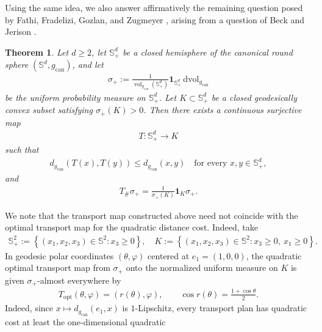 \documentclass[11pt,reqno]{amsart}
\numberwithin{equation}{section}
\newtheorem{thm}{Theorem}[section]
\theoremstyle{definition}
\theoremstyle{remark}
\def\bS {\mathbb{S}}
\newcommand{\0}{\emptyset}
\newcommand{\can}{\mathrm{can}}
\newcommand{\vol}{\operatorname{vol}}
\newcommand{\dvol}{\,\mathrm{dvol}}
\begin{document}
Using the same idea, we also answer affirmatively the remaining question posed by Fathi, Fradelizi, Gozlan, and Zugmeyer \cite{fathi2023some}, arising from a question of Beck and Jerison \cite{beck2021friedland}.
\begin{thm}\label{thm:hemisphere-transport}
Let $d\geq2$, let $\bS^d_+$ be a closed hemisphere of the canonical round
sphere $(\bS^d,g_{\can})$, and let
\begin{align}\label{eq:hemisphere-transport-sigma-plus}
        \sigma_+
        :=
        \frac{1}{\vol_{g_{\can}}(\bS_+^d)}
        \mathbf{1}_{\bS^d_+}\dvol_{g_{\can}}
\end{align}
be the uniform probability measure on $\bS^d_+$. Let
$K\subset\bS^d_+$ be a closed geodesically convex subset satisfying $\sigma_+(K)>0$. Then there exists a continuous surjective map
\begin{align}
        T:\bS^d_+\to K
\end{align}
such that
\begin{align}\label{eq:hemisphere-transport-contraction}
        d_{g_{\can}}(T(x),T(y)) \leq d_{g_{\can}}(x,y)
        \quad
        \text{for every }x,y\in\bS^d_+,
\end{align}
and
\begin{align}\label{eq:hemisphere-transport-pushforward}
        T_\#\sigma_+=\frac{1}{\sigma_+(K)}\mathbf{1}_K\sigma_+.
\end{align}
\end{thm}
We note that the transport map constructed above need not coincide with
the optimal transport map for the quadratic distance cost. Indeed, take
\begin{align}
        \bS^2_+
        :=
        \left\{
        (x_1,x_2,x_3)\in\bS^2:
        x_3\geq0
        \right\},
        \quad 
        K
        :=
        \left\{
        (x_1,x_2,x_3)\in\bS^2:
        x_3\geq0,\ x_1\geq0
        \right\}.
\end{align}
In geodesic polar coordinates $(\theta,\varphi)$ centered at
$e_1=(1,0,0)$, the quadratic optimal transport map from $\sigma_+$ onto
the normalized uniform measure on $K$ is given $\sigma_+$-almost
everywhere by
\begin{align}
        T_{\mathrm{opt}}(\theta,\varphi)
        =
        (r(\theta),\varphi),
        \qquad
        \cos r(\theta)
        =
        \frac{1+\cos\theta}{2}.
\end{align}
Indeed, since $x\mapsto d_{g_{\can}}(e_1,x)$ is $1$-Lipschitz, every
transport plan has quadratic cost at least the one-dimensional quadratic
\end{document}

